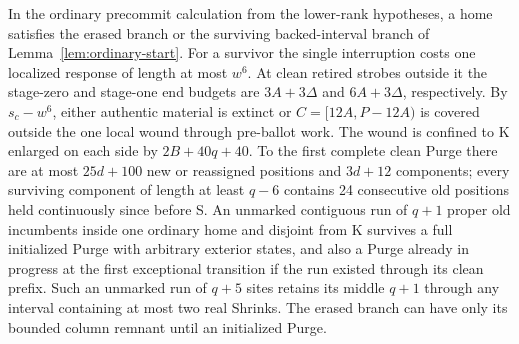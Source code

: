 \begin{lemma}\label{lem:ordinary-response}
In the ordinary precommit calculation from the lower-rank hypotheses, a home satisfies the erased branch or the surviving backed-interval branch of Lemma~\ref{lem:ordinary-start}. For a survivor the single interruption costs one localized response of length at most \(w^6\). At clean retired strobes outside it the stage-zero and stage-one end budgets are \(3A+3\Delta\) and \(6A+3\Delta\), respectively. By \(s_c-w^6\), either authentic material is extinct or \(C=[12A,P-12A)\) is covered outside the one local wound through pre-ballot work. The wound is confined to K enlarged on each side by \(2B+40q+40\). To the first complete clean Purge there are at most \(25d+100\) new or reassigned positions and \(3d+12\) components; every surviving component of length at least \(q-6\) contains 24 consecutive old positions held continuously since before S. An unmarked contiguous run of \(q+1\) proper old incumbents inside one ordinary home and disjoint from K survives a full initialized Purge with arbitrary exterior states, and also a Purge already in progress at the first exceptional transition if the run existed through its clean prefix. Such an unmarked run of \(q+5\) sites retains its middle \(q+1\) through any interval containing at most two real Shrinks. The erased branch can have only its bounded column remnant until an initialized Purge.
\end{lemma}
